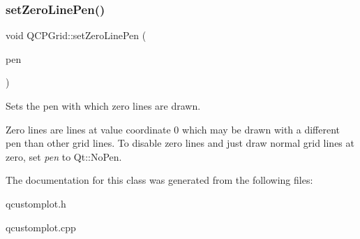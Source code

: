 \subsubsection{\texorpdfstring{set\+Zero\+Line\+Pen()}{setZeroLinePen()}}
{\footnotesize\ttfamily void Q\+C\+P\+Grid\+::set\+Zero\+Line\+Pen (\begin{DoxyParamCaption}\item[{const Q\+Pen \&}]{pen }\end{DoxyParamCaption})}

Sets the pen with which zero lines are drawn.

Zero lines are lines at value coordinate 0 which may be drawn with a different pen than other grid lines. To disable zero lines and just draw normal grid lines at zero, set {\itshape pen} to Qt\+::\+No\+Pen. 

The documentation for this class was generated from the following files\+:\begin{DoxyCompactItemize}
\item 
qcustomplot.\+h\item 
qcustomplot.\+cpp\end{DoxyCompactItemize}
